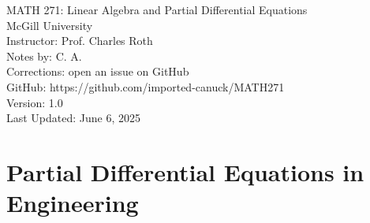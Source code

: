 \documentclass{report}
\begin{document}
\begin{titlepage}
    \vspace*{-8cm}
    \begin{center}
        \vspace*{\fill}
        
        {\Huge MATH 271: Linear Algebra and Partial Differential Equations}\\[0.5cm]
        
        {\Large McGill University}\\[1.5cm]
        
        {\large Instructor: Prof. Charles Roth}\\[0.2cm]
        {\large Notes by: C. A.}\\[1.5cm]
        {\large Corrections: open an issue on GitHub}\\[0.2cm]
        {\large GitHub: https://github.com/imported-canuck/MATH271}\\[2cm]

        {\large Version: 1.0}\\[0.2cm]
        {\large Last Updated: June 6, 2025}\\[2cm]
        
        \vspace*{\fill}
    \end{center}
\end{titlepage}

\tableofcontents



\chapter{Partial Differential Equations in Engineering}
\end{document}
